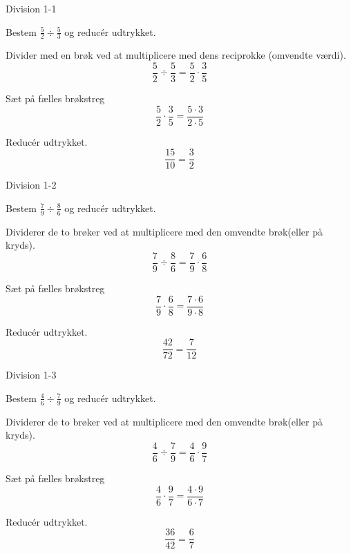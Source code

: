 \documentclass{article}
\begin{document}
\tableofcontents
\newpage

\begin{exercise}{Division 1-1}

Bestem $\frac{5}{2} \div \frac{5}{3}$ og reducér udtrykket.


\hint

Divider med en brøk ved at multiplicere med dens reciprokke (omvendte værdi).
\[
\frac{5}{2} \div \frac{5}{3} = \frac{5}{2} \cdot \frac{3}{5}
\]

\hint

Sæt på fælles brøkstreg
\[
 \frac{5}{2} \cdot \frac{3}{5} = \frac{5 \cdot 3}{2 \cdot 5}
\]

\hint

Reducér udtrykket.
\[
\frac{15}{10} = \frac{3}{2}
\]

\end{exercise}

\newpage

\begin{exercise}{Division 1-2}

Bestem $\frac{7}{9} \div \frac{8}{6}$ og reducér udtrykket.


\hint

Dividerer de to brøker ved at multiplicere med den omvendte brøk(eller på kryds).
\[
\frac{7}{9} \div \frac{8}{6} = \frac{7}{9} \cdot \frac{6}{8}
\]

\hint

Sæt på fælles brøkstreg
\[
\frac{7}{9} \cdot \frac{6}{8} = \frac{7 \cdot 6}{9 \cdot 8}
\]

\hint

Reducér udtrykket.
\[
\frac{42}{72} = \frac{7}{12}
\]

\end{exercise}

\newpage

\begin{exercise}{Division 1-3}

Bestem $\frac{4}{6} \div \frac{7}{9}$ og reducér udtrykket.


\hint

Dividerer de to brøker ved at multiplicere med den omvendte brøk(eller på kryds).
\[
\frac{4}{6} \div \frac{7}{9} = \frac{4}{6} \cdot \frac{9}{7}
\]

\hint

Sæt på fælles brøkstreg
\[
\frac{4}{6} \cdot \frac{9}{7} = \frac{4 \cdot 9}{6 \cdot 7}
\]

\hint

Reducér udtrykket.
\[
\frac{36}{42} = \frac{6}{7}
\]

\end{exercise}
\end{document}
